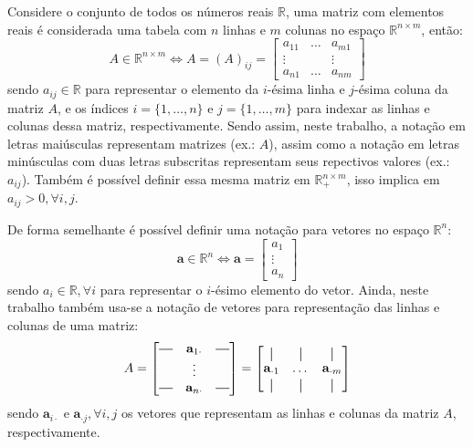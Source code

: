 \documentclass[
    12pt,                %
    oneside,            %
    a4paper,            %
    english,            %
    brazil                %
    ]{abntex2ppgsi}
\newcommand*{\horzbar}{\rule[.5ex]{2.5ex}{0.5pt}}
\newcommand*{\vertbar}{\rule[-1ex]{0.5pt}{2.5ex}}
\begin{document}
Considere o conjunto de todos os números reais $\mathbb{R}$, uma matriz com elementos reais é considerada uma tabela com $n$ linhas e $m$ colunas no espaço $\mathbb{R}^{n \times m}$, então:
\[
    A \in \mathbb{R}^{n \times m} \Leftrightarrow A = (A)_{ij} = \begin{bmatrix}
                                                                     a_{1 1} & \hdots & a_{m 1} \\
                                                                     \vdots  &        & \vdots  \\
                                                                     a_{n 1} & \hdots & a_{n m}
                                                                 \end{bmatrix}
\]
sendo $a_{i j} \in \mathbb{R}$ para representar o elemento da $i$-ésima linha e $j$-ésima coluna da matriz $A$, e os índices $i = \{1, \dots, n\}$ e $j = \{1, \dots, m\}$ para indexar as linhas e colunas dessa matriz, respectivamente.
Sendo assim, neste trabalho, a notação em letras maiúsculas representam matrizes (ex.: $A$), assim como a notação em letras minúsculas com duas letras subscritas representam seus repectivos valores (ex.: $a_{ij}$).
Também é possível definir essa mesma matriz em $\mathbb{R}^{n \times m}_{+}$, isso implica em $a_{ij} > 0, \forall i,j$.

De forma semelhante é possível definir uma notação para vetores no espaço $\mathbb{R}^n$:
\[
    \mathbf{a} \in \mathbb{R}^n \Leftrightarrow \mathbf{a} = \begin{bmatrix}
                                                                     a_{1}  \\
                                                                     \vdots \\
                                                                     a_{n}
                                                                 \end{bmatrix}
\]
sendo $a_i \in \mathbb{R}, \forall i$ para representar o $i$-ésimo elemento do vetor.
Ainda, neste trabalho também usa-se a notação de vetores para representação das linhas e colunas de uma matriz:
\[
    A = \begin{bmatrix}
            \horzbar & \mathbf{a}_{1 \cdot} & \horzbar \\
                     & \vdots               &          \\
            \horzbar & \mathbf{a}_{n \cdot} & \horzbar
        \end{bmatrix}
      = \begin{bmatrix}
            \vertbar             & \vertbar & \vertbar             \\
            \mathbf{a}_{\cdot 1} & \dots    & \mathbf{a}_{\cdot m} \\
            \vertbar             & \vertbar & \vertbar
        \end{bmatrix}
\]
sendo $\mathbf{a}_{i \cdot}$ e $\mathbf{a}_{\cdot j}, \forall i,j$ os vetores que representam as linhas e colunas da matriz $A$, respectivamente.
\end{document}
